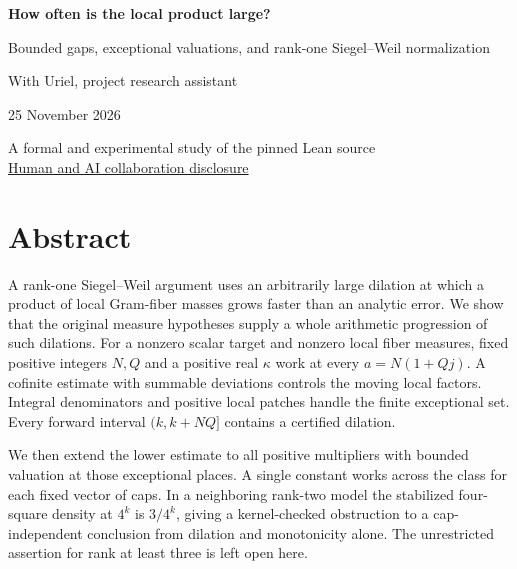 \documentclass[12pt,letterpaper]{article}
\begin{document}

\thispagestyle{empty}
\begin{center}\par\vspace{.72in}
{\fontsize{31}{37}\selectfont\bfseries\color{ink}How often is the local product large?}\par\vspace{.28in}
\begin{minipage}{.86\linewidth}\centering\Large Bounded gaps, exceptional valuations, and rank-one Siegel--Weil normalization\end{minipage}
\par\vspace{.55in}{\large Justin Candler}\par With Uriel, project research assistant\par 25 November 2026
\par\vspace{.48in}\end{center}\vfill
\begin{center}A formal and experimental study of the pinned Lean source\\
\hyperref[collab]{Human and AI collaboration disclosure}\end{center}
\clearpage{}\section*{Abstract}
A rank-one Siegel--Weil argument uses an arbitrarily large dilation at which a product of local Gram-fiber masses grows faster than an analytic error. We show that the original measure hypotheses supply a whole arithmetic progression of such dilations. For a nonzero scalar target and nonzero local fiber measures, fixed positive integers $N,Q$ and a positive real $\kappa$ work at every $a=N(1+Qj)$. A cofinite estimate with summable deviations controls the moving local factors. Integral denominators and positive local patches handle the finite exceptional set. Every forward interval $(k,k+NQ]$ contains a certified dilation.

We then extend the lower estimate to all positive multipliers with bounded valuation at those exceptional places. A single constant works across the class for each fixed vector of caps. In a neighboring rank-two model the stabilized four-square density at $4^k$ is $3/4^k$, giving a kernel-checked obstruction to a cap-independent conclusion from dilation and monotonicity alone. The unrestricted assertion for rank at least three is left open here.
\end{document}

